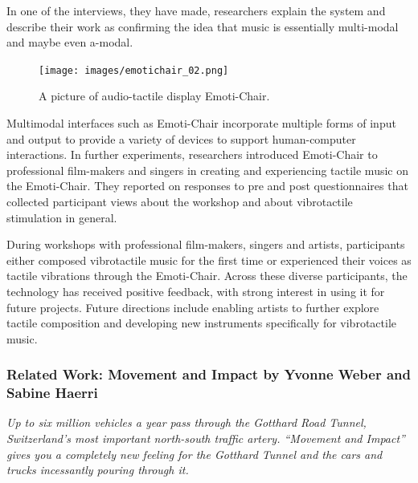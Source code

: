                 In one of the interviews, they have made, researchers explain the system and describe their work as confirming the idea that music is essentially multi-modal and maybe even a-modal.\par

                \begin{figure}[H]
                    \centering
                    \texttt{[image: images/emotichair\_02.png]}
                    \caption{A picture of audio-tactile display Emoti-Chair.}
                    \label{fig:EMOTICHAIR_02}
                \end{figure}                

                Multimodal interfaces such as Emoti-Chair incorporate multiple forms of input and output to provide a variety of devices to support human-computer interactions. In further experiments, researchers introduced Emoti-Chair to professional film-makers and singers in creating and experiencing tactile music on the Emoti-Chair\cite{Composing_Vibrotactile_Music}. They reported on responses to pre and post questionnaires that collected participant views about the workshop and about vibrotactile stimulation in general.\par

                During workshops with professional film-makers, singers and artists, participants either composed vibrotactile music for the first time or experienced their voices as tactile vibrations through the Emoti-Chair. Across these diverse participants, the technology has received positive feedback, with strong interest in using it for future projects. Future directions include enabling artists to further explore tactile composition and developing new instruments specifically for vibrotactile music.\par
            \subsubsection{Related Work: Movement and Impact by Yvonne Weber and Sabine Haerri}
                \emph{Up to six million vehicles a year pass through the Gotthard Road Tunnel, Switzerland's most important north-south traffic artery. “Movement and Impact” gives you a completely new feeling for the Gotthard Tunnel and the cars and trucks incessantly pouring through it.\cite{Movement_and_Impact_ARS}}

